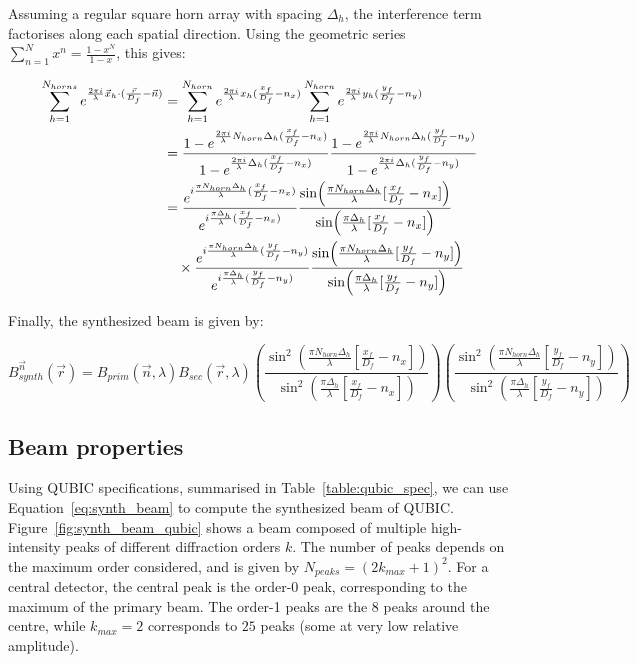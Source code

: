 \documentclass[../../thesis.tex]{subfiles}
\begin{document}
Assuming a regular square horn array with spacing $\Delta_h$, the interference term factorises along each spatial direction. Using the geometric series $\sum_{n=1}^{N} x^n = \frac{1 - x^N}{1 - x}$, this gives:

\begin{align}
    \sum_{h=1}^{N_{horns}}e^{\frac{2\pi i}{\lambda} \vec{x}_h \cdot (\frac{\vec{r}}{D_f} - \vec{n})}
    &= \sum_{h=1}^{N_{horn}}e^{\frac{2\pi i}{\lambda} x_h (\frac{x_f}{D_f} - n_x)} \sum_{h=1}^{N_{horn}}e^{\frac{2\pi i}{\lambda} y_h (\frac{y_f}{D_f} - n_y)} \notag \\
    &= \frac{1 - e^{\frac{2\pi i}{\lambda} N_{horn} \Delta_h (\frac{x_f}{D_f} - n_x)}}{1 - e^{\frac{2\pi i}{\lambda} \Delta_h (\frac{x_f}{D_f} - n_x)}} \frac{1 - e^{\frac{2\pi i}{\lambda} N_{horn} \Delta_h (\frac{y_f}{D_f} - n_y)}}{1 - e^{\frac{2\pi i}{\lambda} \Delta_h (\frac{y_f}{D_f} - n_y)}} \notag \\
    &= \frac{e^{i\frac{\pi N_{horn}\Delta_h}{\lambda}(\frac{x_f}{D_f} - n_x)}}{e^{i\frac{\pi\Delta_h}{\lambda}(\frac{x_f}{D_f} - n_x)}} \frac{\sin(\frac{\pi N_{horn}\Delta_h}{\lambda}[\frac{x_f}{D_f} - n_x])}{\sin(\frac{\pi\Delta_h}{\lambda}[\frac{x_f}{D_f} - n_x])} \notag \\
    &\quad\times \frac{e^{i\frac{\pi N_{horn}\Delta_h}{\lambda}(\frac{y_f}{D_f} - n_y)}}{e^{i\frac{\pi\Delta_h}{\lambda}(\frac{y_f}{D_f} - n_y)}} \frac{\sin(\frac{\pi N_{horn}\Delta_h}{\lambda}[\frac{y_f}{D_f} - n_y])}{\sin(\frac{\pi\Delta_h}{\lambda}[\frac{y_f}{D_f} - n_y])}
\end{align}

Finally, the synthesized beam is given by:

\begin{equation} \label{eq:synth_beam}
    B_{synth}^{\vec{n}}(\vec{r}) = B_{prim}(\vec{n}, \lambda)B_{sec}(\vec{r}, \lambda) \left(\frac{\sin^{2}(\frac{\pi N_{horn}\Delta_h}{\lambda}[\frac{x_f}{D_f} - n_x])}{\sin^{2}(\frac{\pi\Delta_h}{\lambda}[\frac{x_f}{D_f} - n_x])}\right)\left(\frac{\sin^{2}(\frac{\pi N_{horn}\Delta_h}{\lambda}[\frac{y_f}{D_f} - n_y])}{\sin^{2}(\frac{\pi\Delta_h}{\lambda}[\frac{y_f}{D_f} - n_y])}\right)
\end{equation}

\subsection{Beam properties} \label{sub:beam_properties}

Using QUBIC specifications, summarised in Table~\ref{table:qubic_spec}, we can use Equation~\ref{eq:synth_beam} to compute the synthesized beam of QUBIC. Figure~\ref{fig:synth_beam_qubic} shows a beam composed of multiple high-intensity peaks of different diffraction orders $k$. The number of peaks depends on the maximum order considered, and is given by $N_{peaks} = (2k_{max} + 1)^2$. For a central detector, the central peak is the order-0 peak, corresponding to the maximum of the primary beam. The order-1 peaks are the 8 peaks around the centre, while $k_{max} = 2$ corresponds to $25$ peaks (some at very low relative amplitude).
\end{document}
